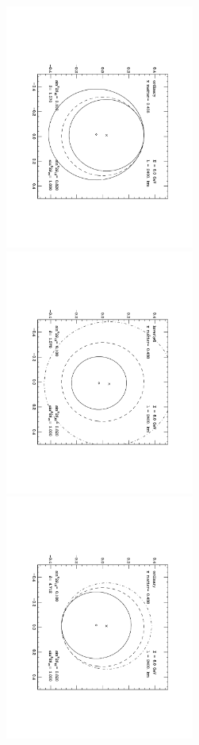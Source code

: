 \begin{figure}[!h]\begin{center}
\includegraphics[width=2.45in,angle=90]{RNC/cpv_wash_pibytwo.pdf}
\includegraphics[width=2.45in,angle=90]{RNC/cpv_wash_pibytwo_inv.pdf}
\includegraphics[width=2.45in,angle=90]{RNC/cpv_wash_threepibytwo.pdf}

\end{center}
\end{figure}
